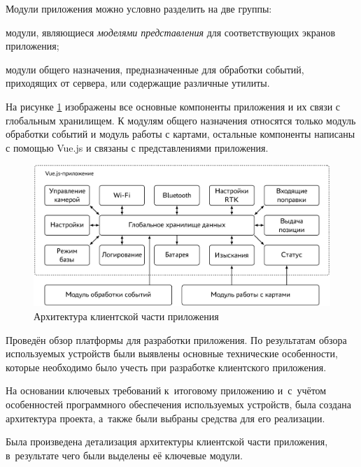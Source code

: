 \documentclass[pta]{../../../scs-iam}
\begin{document}
Модули приложения можно условно разделить на две группы:
\begin{dashitemize}
  \item модули, являющиеся \emph{моделями представления} для соответствующих экранов приложения;
  \item модули общего назначения, предназначенные для обработки событий, приходящих от сервера, или содержащие различные утилиты.
\end{dashitemize}

На рисунке \ref{fig:fe-architecture} изображены все основные компоненты приложения и их связи с глобальным хранилищем. К модулям общего назначения относятся только модуль обработки событий и модуль работы с картами, остальные компоненты написаны с помощью Vue.js и связаны с представлениями приложения.

\begin{figure}[h!]
  \centering
  \setlength{\fboxsep}{5pt}
  \includegraphics[width=\textwidth]{../../../img/tikz/fe-architecture/pic}
  \caption{Архитектура клиентской части приложения}\label{fig:fe-architecture}
\end{figure}


\begin{dashitemize}
  \item Проведён обзор платформы для разработки приложения. По результатам обзора используемых устройств были выявлены основные технические особенности, которые необходимо было учесть при разработке клиентского приложения.
  \item На основании ключевых требований к~итоговому приложению и~с~учётом особенностей программного обеспечения используемых устройств, была создана архитектура проекта, а~также были выбраны средства для его реализации.
  \item Была произведена детализация архитектуры клиентской части приложения, в~результате чего были выделены её ключевые модули.
\end{dashitemize}
\end{document}
